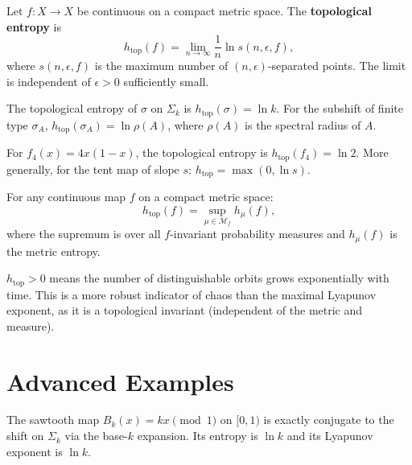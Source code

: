 \begin{definition}
Let $f : X \to X$ be continuous on a compact metric space. The
\textbf{topological entropy} is
\[
    h_{\mathrm{top}}(f) = \lim_{n \to \infty} \frac{1}{n}\ln s(n, \epsilon, f),
\]
where $s(n, \epsilon, f)$ is the maximum number of $(n, \epsilon)$-separated
points. The limit is independent of $\epsilon > 0$ sufficiently small.
\end{definition}

\begin{theorem}
The topological entropy of $\sigma$ on $\Sigma_k$ is
$h_{\mathrm{top}}(\sigma) = \ln k$. For the subshift of finite type
$\sigma_A$, $h_{\mathrm{top}}(\sigma_A) = \ln\rho(A)$, where $\rho(A)$ is
the spectral radius of $A$.
\end{theorem}

\begin{proposition}
For $f_4(x) = 4x(1-x)$, the topological entropy is
$h_{\mathrm{top}}(f_4) = \ln 2$. More generally, for the tent map of slope
$s$: $h_{\mathrm{top}} = \max(0, \ln s)$.
\end{proposition}

\begin{theorem}
For any continuous map $f$ on a compact metric space:
\[
    h_{\mathrm{top}}(f) = \sup_{\mu \in \mathcal{M}_f} h_\mu(f),
\]
where the supremum is over all $f$-invariant probability measures and
$h_\mu(f)$ is the metric entropy.
\end{theorem}

\begin{attention}[title=\textbf{Entropy and complexity}]
$h_{\mathrm{top}} > 0$ means the number of distinguishable orbits grows
exponentially with time. This is a more robust indicator of chaos than the
maximal Lyapunov exponent, as it is a topological invariant (independent of
the metric and measure).
\end{attention}

\section{Advanced Examples}

\begin{example}
The sawtooth map $B_k(x) = kx \pmod{1}$ on $[0,1)$ is exactly conjugate to
the shift on $\Sigma_k$ via the base-$k$ expansion. Its entropy is $\ln k$
and its Lyapunov exponent is $\ln k$.
\end{example}

